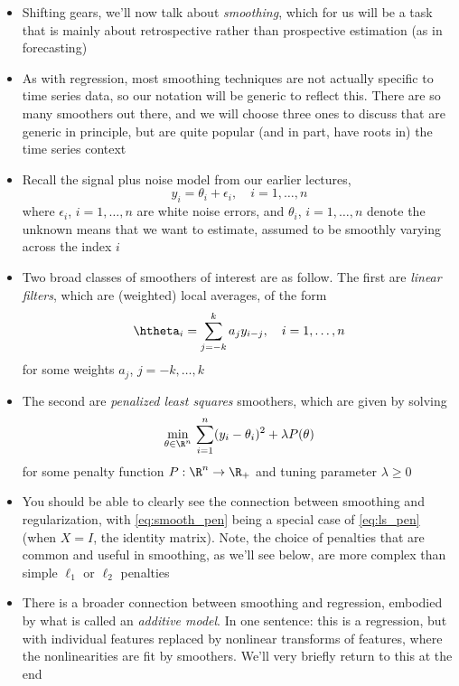 \documentclass{article}
\begin{document}
\begin{itemize}
\item Shifting gears, we'll now talk about \emph{smoothing}, which for us will
  be a task that is mainly about retrospective rather than prospective
  estimation (as in forecasting)

\item As with regression, most smoothing techniques are not actually specific to
  time series data, so our notation will be generic to reflect this. There are
  so many smoothers out there, and we will choose three ones to discuss that are
  generic in principle, but are quite popular (and in part, have roots in) the
  time series context  

\item Recall the signal plus noise model from our earlier lectures, 
  \[
  y_i = \theta_i + \epsilon_i, \quad i = 1,\dots,n
  \]
  where $\epsilon_i$, $i=1,\dots,n$ are white noise errors, and $\theta_i$, $i =
  1,\dots,n$ denote the unknown means that we want to estimate, assumed to be
  smoothly varying across the index $i$

\item Two broad classes of smoothers of interest are as follow. The first are
  \emph{linear filters}, which are (weighted) local averages, of the form  
  \begin{equation}
  \label{eq:smooth_lin}
  \htheta_i = \sum_{j=-k}^k a_j y_{i-j},\quad i = 1,\dots,n
  \end{equation}
  for some weights $a_j$, $j = -k,\dots,k$

\item The second are \emph{penalized least squares} smoothers, which are given
  by solving    
  \begin{equation}
  \label{eq:smooth_pen}
  \min_{\theta \in \R^n} \, \sum_{i=1}^n (y_i - \theta_i)^2 + \lambda P(\theta) 
  \end{equation}
  for some penalty function $P : \R^n \to \R_+$ and tuning parameter $\lambda 
  \geq 0$   

\item You should be able to clearly see the connection between smoothing and
  regularization, with \eqref{eq:smooth_pen} being a special case of
  \eqref{eq:ls_pen} (when $X = I$, the identity matrix). Note, the choice of
  penalties that are common and useful in smoothing, as we'll see below, are
  more complex than simple $\ell_1$ or $\ell_2$ penalties  

\item There is a broader connection between smoothing and regression, embodied
  by what is called an \emph{additive model}. In one sentence: this is a
  regression, but with individual features replaced by nonlinear transforms of
  features, where the nonlinearities are fit by smoothers. We'll very briefly
  return to this at the end
\end{itemize}
\end{document}
